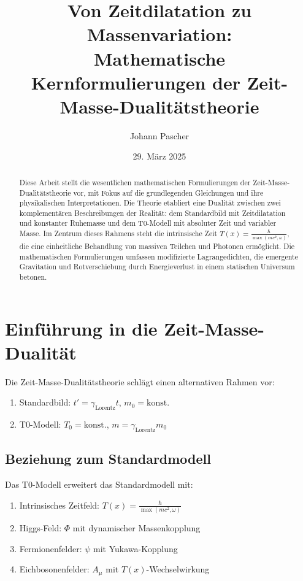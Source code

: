 \documentclass[12pt,a4paper]{article}
\title{Von Zeitdilatation zu Massenvariation: \\ Mathematische Kernformulierungen der Zeit-Masse-Dualitätstheorie}
\author{Johann Pascher}
\date{29. März 2025}
\newcommand{\Tfield}{T(x)}
\newcommand{\Tzero}{T_0}
\newcommand{\gammaf}{\gamma_{\text{Lorentz}}}
\theoremstyle{definition}
\theoremstyle{remark}
\begin{document}
	
	\maketitle
	
	\begin{abstract}
		Diese Arbeit stellt die wesentlichen mathematischen Formulierungen der Zeit-Masse-Dualitätstheorie vor, mit Fokus auf die grundlegenden Gleichungen und ihre physikalischen Interpretationen. Die Theorie etabliert eine Dualität zwischen zwei komplementären Beschreibungen der Realität: dem Standardbild mit Zeitdilatation und konstanter Ruhemasse und dem T0-Modell mit absoluter Zeit und variabler Masse. Im Zentrum dieses Rahmens steht die intrinsische Zeit \( \Tfield = \frac{\hbar}{\max(m c^2, \omega)} \), die eine einheitliche Behandlung von massiven Teilchen und Photonen ermöglicht. Die mathematischen Formulierungen umfassen modifizierte Lagrangedichten, die emergente Gravitation und Rotverschiebung durch Energieverlust in einem statischen Universum betonen.
	\end{abstract}
	
	\tableofcontents
	\newpage
	
	\section{Einführung in die Zeit-Masse-Dualität}
	Die Zeit-Masse-Dualitätstheorie schlägt einen alternativen Rahmen vor:
	\begin{enumerate}
		\item Standardbild: \( t' = \gammaf t \), \( m_0 = \text{konst.} \)
		\item T0-Modell: \( \Tzero = \text{konst.} \), \( m = \gammaf m_0 \)
	\end{enumerate}
	
	\subsection{Beziehung zum Standardmodell}
	Das T0-Modell erweitert das Standardmodell mit:
	\begin{enumerate}
		\item Intrinsisches Zeitfeld: \( \Tfield = \frac{\hbar}{\max(m c^2, \omega)} \)
		\item Higgs-Feld: \( \Phi \) mit dynamischer Massenkopplung
		\item Fermionenfelder: \( \psi \) mit Yukawa-Kopplung
		\item Eichbosonenfelder: \( A_\mu \) mit \( \Tfield \)-Wechselwirkung
	\end{enumerate}
	
\end{document}
